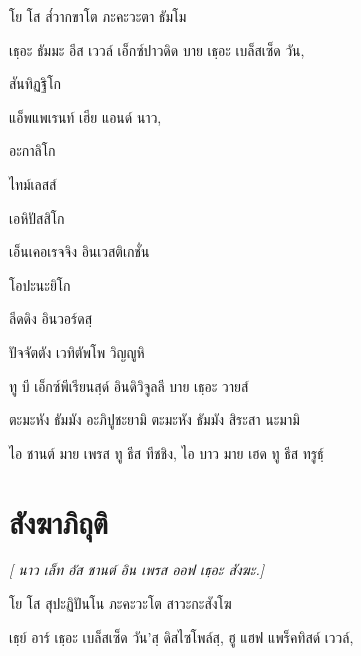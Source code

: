 โย โส ส๎วากขาโต ภะคะวะตา ธัมโม

\begin{english}
เธฺอะ ธัมมะ อีส เววล์ เอ็กซ์ปาวดิด บาย เธฺอะ เบล็สเซ็ด วัน,
\end{english}

สันทิฏฐิโก

\begin{english}
แอ็พแพเรนท์ เฮีย แอนด์ นาว,
\end{english}

อะกาลิโก

\begin{english}
ไทม์เลสส์
\end{english}

เอหิปัสสิโก

\begin{english}
เอ็นเคอเรจจิง อินเวสติเกชั่น
\end{english}

โอปะนะยิโก

\begin{english}
ลีดดิง อินวอร์ดสฺ
\end{english}

ปัจจัตตัง เวทิตัพโพ วิญญูหิ

\begin{english}
ทู บี เอ็กซ์พีเรียนสฺด์ อินดิวิจูลลี บาย เธฺอะ วายส์
\end{english}

ตะมะหัง ธัมมัง อะภิปูชะยามิ ตะมะหัง ธัมมัง สิระสา นะมามิ

\begin{english}
	ไอ ชานต์ มาย เพรส ทู ธีส ทีชชิง, ไอ บาว มาย เฮด ทู ธีส ทรูธฺ์
\end{english}


\chapter{สังฆาภิถุติ}

\begin{leader}
\end{leader}

\begin{leader}
\textit{[ นาว เล็ท อัส ชานต์ อิน เพรส ออฟ เธฺอะ สังฆะ.]}
\end{leader}

โย โส สุปะฏิปันโน ภะคะวะโต สาวะกะสังโฆ

\begin{english}
เธฺย์ อาร์ เธฺอะ เบล็สเซ็ด วัน’สฺ ดิสไซโพล์สฺ, ฮู แฮฟ แพร็คทิสด์ เววล์,
\end{english}

